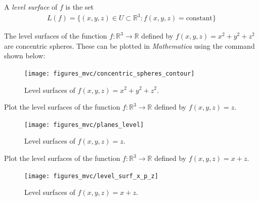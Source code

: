 \documentclass[12pt,letterpaper,reqno]{article}
\numberwithin{equation}{section}
\newcommand{\R}{\ensuremath{\mathbb R}}
\begin{document}
{\begin{defn}
A \emph{level surface} of $f$ is the set
\begin{align*}
	L(f)=\{(x,y,z) \in U \subset \mathbb{R}^3:f(x,y,z)=\text{constant}\}
\end{align*}	
\end{defn}
\newpage
\begin{example}
The level surfaces of the function $f:\R^3 \to \R$ defined by $f(x,y,z)=x^2+y^2+z^2$ are concentric spheres. These can be plotted in \emph{Mathematica} using the command shown below:
\begin{figure}[h]
	\begin{center}
		\texttt{[image: figures\_mvc/concentric\_spheres\_contour]}
	\end{center}
	\caption{Level surfaces of $f(x,y,z)=x^2+y^2+z^2$.}
\end{figure}
\end{example}
\newpage 
\begin{exercise}
Plot the level surfaces of the function $f:\R^3 \to \R$ defined by $f(x,y,z)=z$.	
\end{exercise}

{\color{red}
\begin{solution}
	\begin{figure}[h]
	\begin{center}
		\texttt{[image: figures\_mvc/planes\_level]}
	\end{center}
	\caption{Level surfaces of $f(x,y,z)=z$.}
\end{figure}
\end{solution}}

\begin{exercise}
Plot the level surfaces of the function $f:\R^3 \to \R$ defined by $f(x,y,z)=x+z$.	
\end{exercise}
{\color{red}
\begin{solution}
	\begin{figure}[h]
	\begin{center}
		\texttt{[image: figures\_mvc/level\_surf\_x\_p\_z]}
	\end{center}
	\caption{Level surfaces of $f(x,y,z)=x+z$.}
\end{figure}
\end{solution}}

}
\end{document}
